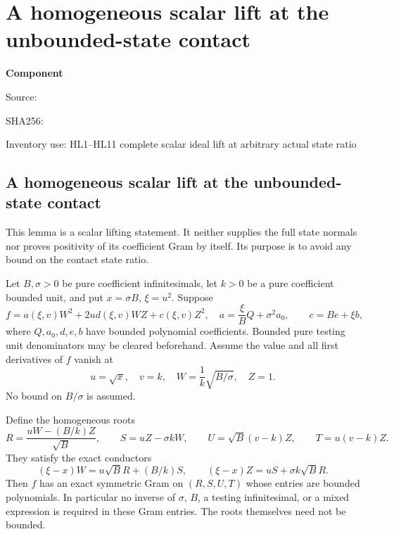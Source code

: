\chapter{A homogeneous scalar lift at the unbounded-state contact}
\label{component:pbb29c73cc124}
\noindent\textbf{Component }\par
{\small\noindent Source: \par}
{\small\noindent SHA256: \par}
{\small\noindent Inventory use: HL1--HL11 complete scalar ideal lift at arbitrary actual state ratio\par}
\medskip
\section[A homogeneous scalar lift at the unbounded-state contact]{A homogeneous scalar lift at the unbounded-state contact}
\label{pbb29c73cc124:sec:unbounded-b-homogeneous-scalar}

This lemma is a scalar lifting statement.  It neither supplies the full
state normals nor proves positivity of its coefficient Gram by itself.
Its purpose is to avoid any bound on the contact state ratio.

Let $B,\sigma>0$ be pure coefficient infinitesimals, let $k>0$ be a
pure coefficient bounded unit, and put $x=\sigma B$, $\xi=u^2$.
Suppose
\[
 f=a(\xi,v)W^2+2u d(\xi,v)WZ+c(\xi,v)Z^2,
 \quad
 a=\frac\xi B Q+\sigma^2 a_0,\qquad
 c=B e+\xi b,                                      \tag{HL1}
\]
where $Q,a_0,d,e,b$ have bounded polynomial coefficients.  Bounded
pure testing unit denominators may be cleared beforehand.
Assume the value and all first derivatives of $f$ vanish at
\[
 u=\sqrt{x},\quad v=k,\quad
 W=\frac1k\sqrt{B/\sigma},\quad Z=1.                \tag{HL2}
\]
No bound on $B/\sigma$ is assumed.

Define the homogeneous roots
\[
 R=\frac{uW-(B/k)Z}{\sqrt B},\qquad
 S=uZ-\sigma kW,\qquad
 U=\sqrt B(v-k)Z,\qquad T=u(v-k)Z.                 \tag{HL3}
\]
They satisfy the exact conductors
\[
 (\xi-x)W=u\sqrt B R+(B/k)S,
 \qquad
 (\xi-x)Z=uS+\sigma k\sqrt B R.                    \tag{HL4}
\]
Then $f$ has an exact symmetric Gram on $(R,S,U,T)$ whose entries
are bounded polynomials.  In particular no inverse of $\sigma$,
$B$, a testing infinitesimal, or a mixed expression is required in
these Gram entries.  The roots themselves need not be bounded.


